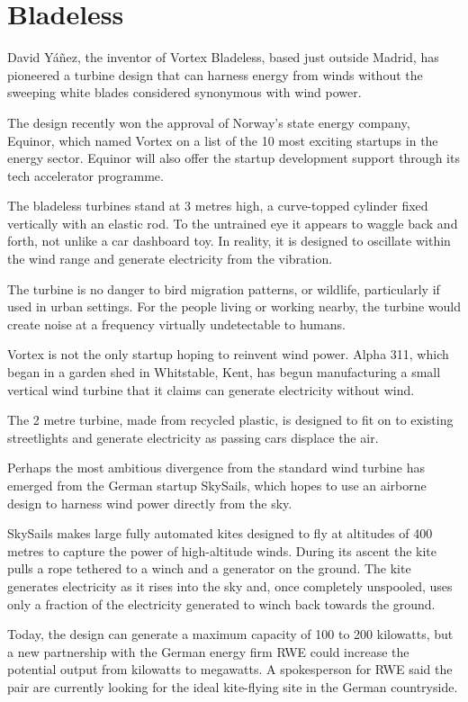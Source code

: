 \documentclass[
]{book}
\begin{document}
\hypertarget{bladeless}{%
\section{Bladeless}\label{bladeless}}

David Yáñez, the inventor of Vortex Bladeless, based just outside Madrid,
has pioneered a turbine design that can harness energy from winds
without the sweeping white blades considered synonymous with wind power.

The design recently won the approval of Norway's state energy company, Equinor,
which named Vortex on a list of the 10 most exciting startups in the energy sector.
Equinor will also offer the startup development support through its tech accelerator programme.

The bladeless turbines stand at 3 metres high,
a curve-topped cylinder fixed vertically with an elastic rod.
To the untrained eye it appears to waggle back and forth,
not unlike a car dashboard toy.
In reality, it is designed to oscillate within the wind range and
generate electricity from the vibration.

The turbine is no danger to bird migration patterns, or wildlife, particularly if used in urban settings. For the people living or working nearby, the turbine would create noise at a frequency virtually undetectable to humans.

Vortex is not the only startup hoping to reinvent wind power. Alpha 311, which began in a garden shed in Whitstable, Kent, has begun manufacturing a small vertical wind turbine that it claims can generate electricity without wind.

The 2 metre turbine, made from recycled plastic, is designed to fit on to existing streetlights and generate electricity as passing cars displace the air.

Perhaps the most ambitious divergence from the standard wind turbine has emerged from the German startup SkySails, which hopes to use an airborne design to harness wind power directly from the sky.

SkySails makes large fully automated kites designed to fly at altitudes of 400 metres to capture the power of high-altitude winds. During its ascent the kite pulls a rope tethered to a winch and a generator on the ground. The kite generates electricity as it rises into the sky and, once completely unspooled, uses only a fraction of the electricity generated to winch back towards the ground.

Today, the design can generate a maximum capacity of 100 to 200 kilowatts, but a new partnership with the German energy firm RWE could increase the potential output from kilowatts to megawatts. A spokesperson for RWE said the pair are currently looking for the ideal kite-flying site in the German countryside.
\end{document}
